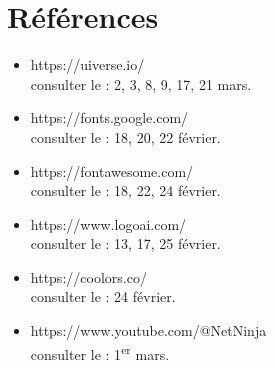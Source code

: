 \documentclass{report}
\begin{document}
\section*{Références}
\vspace*{1cm} 
\begin{itemize}[topsep=6cm, itemsep=6pt, partopsep=0pt, parsep=0pt]
    \item https://uiverse.io/ \\
    consulter le : 2, 3, 8, 9, 17, 21 mars.
    \item https://fonts.google.com/  \\
    consulter le : 18, 20, 22 février.
    \item https://fontawesome.com/ \\
    consulter le : 18, 22, 24 février. 
    \item https://www.logoai.com/ \\
    consulter le : 13, 17, 25 février.
    \item https://coolors.co/ \\
    consulter le : 24 février.
    \item https://www.youtube.com/@NetNinja \\
    consulter le : 1\textsuperscript{er} mars.
   
\end{itemize}

\end{document}
